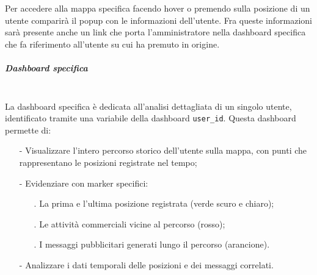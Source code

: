 \documentclass[10pt]{article}
\newcommand{\mysubparagraph}[1]{\subparagraph{#1}\mbox{}\\}
\begin{document}
        Per accedere alla mappa specifica facendo hover o premendo sulla posizione di un utente comparirà il popup con le informazioni dell'utente.
        Fra queste informazioni sarà presente anche un link che porta l'amministratore nella dashboard specifica che fa riferimento all'utente su cui ha premuto in origine.\\

        \mysubparagraph{Dashboard specifica}
        La dashboard specifica è dedicata all'analisi dettagliata di un singolo utente, identificato tramite una variabile della dashboard \texttt{user\_id}. Questa dashboard permette di:

        \begin{itemize}
            \item[-] Visualizzare l'intero percorso storico dell'utente sulla mappa, con punti che rappresentano le posizioni registrate nel tempo;
            \item[-] Evidenziare con marker specifici:
            \begin{itemize}
                \item[.] La prima e l'ultima posizione registrata (verde scuro e chiaro);
                \item[.] Le attività commerciali vicine al percorso (rosso);
                \item[.] I messaggi pubblicitari generati lungo il percorso (arancione).
            \end{itemize}
            \item[-] Analizzare i dati temporali delle posizioni e dei messaggi correlati.
        \end{itemize}
\end{document}
